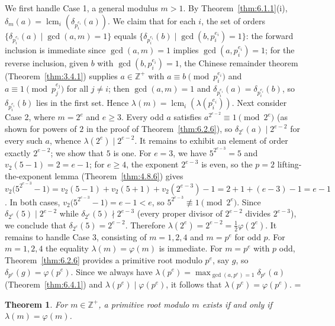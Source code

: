 \documentclass[11pt]{article}
\makeatletter
\theoremstyle{ntstyle}
\newtheorem{theorem}{Theorem}[subsection]
\let\nt@closedisplay\]
\def\nt@guardedclose{\@ifnextchar\par{\nt@closeafterpar}{\@ifnextchar\end{\postdisplaypenalty\@M\nt@closedisplay}{\nt@closedisplay}}}
\def\nt@closeafterpar\par{\@ifnextchar\par{\nt@closeafterpar}{\@ifnextchar\end{\postdisplaypenalty\@M\nt@closedisplay\par}{\nt@closedisplay\par}}}
\renewenvironment{proof}[1][\proofname]{\par
  \pushQED{\qed}\normalfont\topsep\medskipamount\edef\nt@afterproof{\@endparpenalty=\the\@endparpenalty\relax}\@beginparpenalty\@M\@endparpenalty\@M\let\]\nt@guardedclose\trivlist\item[]\textit{#1\@addpunct{.}} \ignorespaces}{\ifvmode\addpenalty\@M\fi\popQED\nt@afterproof\endtrivlist\@endpefalse}
\DeclareMathOperator{\lcm}{lcm}
\makeatother
\begin{document}
\begin{proof} We first handle Case 1, a general modulus $m>1$. By
	Theorem~\ref{thm:6.1.1}(i), $\delta_m(a) =
		\lcm_i(\delta_{p_i^{e_i}}(a))$. We claim that for each
	$i$, the set of orders $\{\delta_{p_i^{e_i}}(a) \mid \gcd(a, m)=1\}$
	equals $\{\delta_{p_i^{e_i}}(b) \mid \gcd(b, p_i^{e_i})=1\}$: the forward
	inclusion is immediate since $\gcd(a, m)=1$ implies
	$\gcd(a, p_i^{e_i})=1$; for the reverse inclusion, given $b$ with
	$\gcd(b, p_i^{e_i})=1$, the Chinese remainder theorem (Theorem~\ref{thm:3.4.1}) supplies
	$a \in \mathbb{Z}^+$ with $a \equiv b \pmod{p_i^{e_i}}$ and $a
		\equiv 1 \pmod{p_j^{e_j}}$ for all $j \neq i$; then $\gcd(a, m)=1$ and
	$\delta_{p_i^{e_i}}(a) = \delta_{p_i^{e_i}}(b)$, so
	$\delta_{p_i^{e_i}}(b)$ lies in the first set. Hence $\lambda(m) =
		\lcm_i(\lambda(p_i^{e_i}))$. Next consider Case 2, where $m = 2^{e}$ and $e \ge 3$. Every odd $a$ satisfies
	$a^{2^{e-2}} \equiv 1 \pmod{2^e}$ (as shown for powers of $2$ in the proof of
	Theorem~\ref{thm:6.2.6}), so
	$\delta_{2^e}(a) \mid 2^{e-2}$ for every such $a$, whence
	$\lambda(2^e) \mid 2^{e-2}$. It remains to exhibit an element of
	order exactly $2^{e-2}$; we show that $5$ is one. For $e = 3$,
	we have $5^{2^{e-3}} = 5$ and $v_2(5-1) = 2 = e-1$; for $e \ge 4$, the exponent $2^{e-3}$
	is even, so the $p=2$ lifting-the-exponent lemma (Theorem~\ref{thm:4.8.6}) gives $v_2\big(5^{2^{e-3}}
		- 1\big) = v_2(5-1) + v_2(5+1) + v_2(2^{e-3}) - 1 = 2 + 1 + (e-3) - 1
		= e-1$. In both cases, $v_2\big(5^{2^{e-3}} - 1\big) = e-1 < e$, so
	$5^{2^{e-3}} \not\equiv 1 \pmod{2^e}$. Since $\delta_{2^e}(5) \mid
		2^{e-2}$ while $\delta_{2^e}(5) \nmid 2^{e-3}$ (every proper divisor
	of $2^{e-2}$ divides $2^{e-3}$), we conclude that $\delta_{2^e}(5) =
		2^{e-2}$. Therefore $\lambda(2^{e}) = 2^{e-2} =
		\tfrac{1}{2}\varphi(2^{e})$. It remains to handle Case 3, consisting of $m = 1,2,4$ and $m=p^e$
		for odd $p$. For $m=1,2,4$ the equality
	$\lambda(m)=\varphi(m)$ is immediate. For $m=p^e$ with $p$ odd,
	Theorem~\ref{thm:6.2.6} provides a primitive root modulo $p^e$, say $g$, so
	$\delta_{p^e}(g)=\varphi(p^e)$. Since we always have
	$\lambda(p^e)=\max_{\gcd(a, p^e)=1}\delta_{p^e}(a)$ (Theorem~\ref{thm:6.4.1}) and
	$\lambda(p^e)\mid\varphi(p^e)$, it follows that
	$\lambda(p^e)=\varphi(p^e)$.
\end{proof}
\begin{theorem}\label{thm:6.4.3} For $m\in\mathbb{Z}^+$, a primitive root modulo $m$ exists
	if and only if $\lambda(m) = \varphi(m)$.
\end{theorem}
\end{document}

